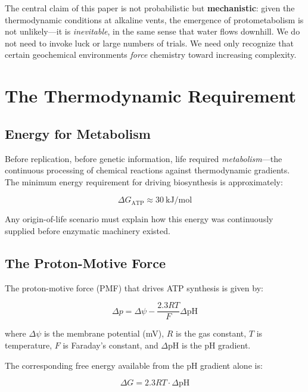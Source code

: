 \documentclass[11pt,twocolumn]{article}
\begin{document}
The central claim of this paper is not probabilistic but \textbf{mechanistic}: given the thermodynamic conditions at alkaline vents, the emergence of protometabolism is not unlikely—it is \textit{inevitable}, in the same sense that water flows downhill. We do not need to invoke luck or large numbers of trials. We need only recognize that certain geochemical environments \textit{force} chemistry toward increasing complexity.

\section{The Thermodynamic Requirement}

\subsection{Energy for Metabolism}

Before replication, before genetic information, life required \textit{metabolism}—the continuous processing of chemical reactions against thermodynamic gradients. The minimum energy requirement for driving biosynthesis is approximately:

\begin{equation}
\Delta G_{\text{ATP}} \approx 30\ \text{kJ/mol}
\end{equation}

Any origin-of-life scenario must explain how this energy was continuously supplied before enzymatic machinery existed.

\subsection{The Proton-Motive Force}

The proton-motive force (PMF) that drives ATP synthesis is given by:

\begin{equation}
\Delta p = \Delta\psi - \frac{2.3RT}{F}\Delta\text{pH}
\label{eq:pmf}
\end{equation}

where $\Delta\psi$ is the membrane potential (mV), $R$ is the gas constant, $T$ is temperature, $F$ is Faraday's constant, and $\Delta\text{pH}$ is the pH gradient.

The corresponding free energy available from the pH gradient alone is:

\begin{equation}
\Delta G = 2.3RT \cdot \Delta\text{pH}
\label{eq:deltag}
\end{equation}
\end{document}
